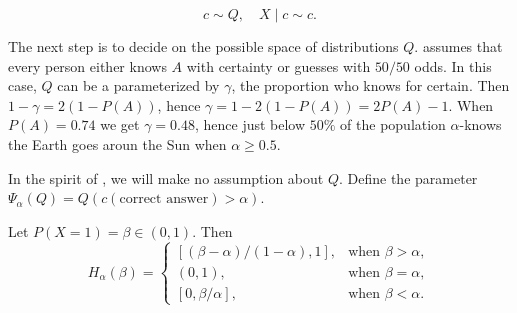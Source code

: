 \[
c\sim Q,\quad X\mid c\sim c.
\]

The next step is to decide on the possible space of distributions
$Q$. \cite[Chapter 2, endnote 28]{Caplan2018-oj} assumes that every
person either knows $A$ with certainty or guesses with $50/50$ odds.
In this case, $Q$ can be a parameterized by $\gamma$, the proportion
who knows for certain. Then $1-\gamma=2(1-P(A))$, hence $\gamma=1-2(1-P(A))=2P(A)-1$.
When $P(A)=0.74$ we get $\gamma=0.48$, hence just below $50\%$
of the population $\alpha$-knows the Earth goes aroun the Sun when
$\alpha\geq0.5$.

In the spirit of \cite{Manski2003-aq}, we will make no assumption
about $Q$. Define the parameter $\Psi_{\alpha}(Q)=Q(c(\textrm{correct answer})>\alpha).$ 
\begin{proposition}
\label{prop:guessing regions}Let $P(X=1)=\beta\in(0,1)$. Then 
\[
H_{\alpha}(\beta)=\begin{cases}
[(\beta-\alpha)/(1-\alpha),1], & \textrm{when }\beta>\alpha,\\
(0,1), & \textrm{when }\beta=\alpha,\\{}
[0,\beta/\alpha], & \textrm{when }\beta<\alpha.
\end{cases}
\]
\end{proposition}

